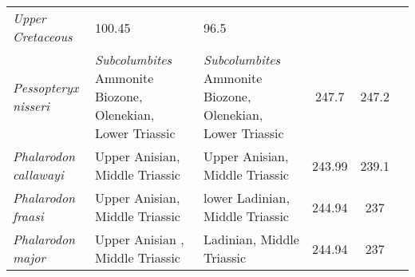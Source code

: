 \begin{longtabu}{>{\itshape}lXXSSl}
        Upper Cretaceous
                                                             & 100.45
                                                             & 96.5
                                                             &
                                                             \cite{Fischer2016P} \\                    
	Pessopteryx nisseri                                  &
        \emph{Subcolumbites} Ammonite Biozone, Olenekian, Lower Triassic
                                                             &
        \emph{Subcolumbites} Ammonite Biozone, Olenekian, Lower Triassic
                                                             & 247.7
                                                             & 247.2
                                                             &
                                                             \cite{Wiman1910BGIU} \\                      
	Phalarodon callawayi                                 & Upper Anisian,
        Middle Triassic
                                                             & Upper Anisian,
        Middle Triassic
                                                             & 243.99
                                                             & 239.1
                                                             &
                                                             \cite{Schmitz2004PAP} \\                    
	Phalarodon fraasi                                    & Upper Anisian,
        Middle Triassic
                                                             & lower Ladinian,
        Middle Triassic
                                                             & 244.94
                                                             & 237
                                                             &
                                                             \cite{Merriam1910UCBDG} \\                    
	Phalarodon major                                     & Upper Anisian ,
        Middle Triassic
                                                             & Ladinian, Middle
        Triassic
                                                             & 244.94
                                                             & 237
                                                             &
                                                             \cite{Maisch2005NJGPM} \\                     

\end{longtabu}
